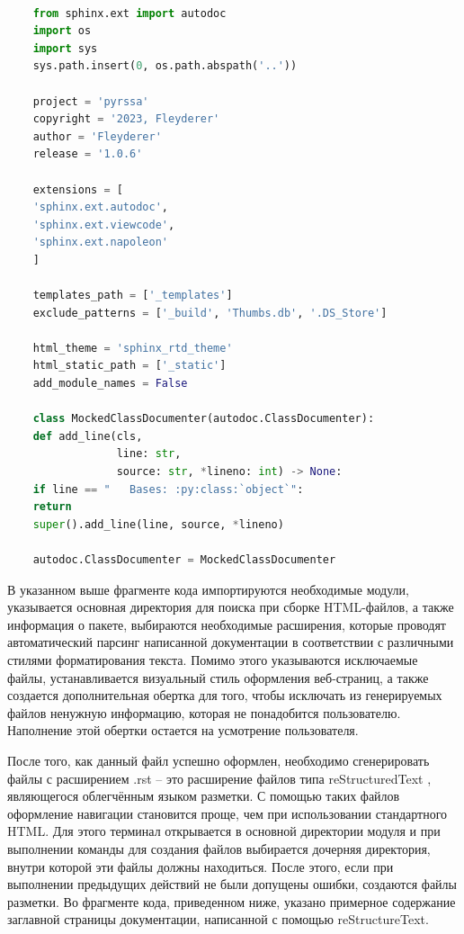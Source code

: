 \documentclass[specialist,
			   substylefile = spbu_report.rtx,
			   subf,href,colorlinks=true, 12pt]{disser}
\begin{document}
\begin{lstlisting}[language=Python, caption=Содержимое конфигурационного файла.]
	
	from sphinx.ext import autodoc
	import os
	import sys
	sys.path.insert(0, os.path.abspath('..'))

	project = 'pyrssa'
	copyright = '2023, Fleyderer'
	author = 'Fleyderer'
	release = '1.0.6'
	
	extensions = [
	'sphinx.ext.autodoc',
	'sphinx.ext.viewcode',
	'sphinx.ext.napoleon'
	]
	
	templates_path = ['_templates']
	exclude_patterns = ['_build', 'Thumbs.db', '.DS_Store']
	
	html_theme = 'sphinx_rtd_theme'
	html_static_path = ['_static']
	add_module_names = False
	
	class MockedClassDocumenter(autodoc.ClassDocumenter):
	def add_line(cls,
	             line: str, 
	             source: str, *lineno: int) -> None:
	if line == "   Bases: :py:class:`object`":
	return
	super().add_line(line, source, *lineno)
	
	autodoc.ClassDocumenter = MockedClassDocumenter
\end{lstlisting}

В указанном выше фрагменте кода импортируются необходимые модули, указывается основная директория для поиска при сборке HTML-файлов, а также информация о пакете, выбираются необходимые расширения, которые проводят автоматический парсинг написанной документации в соответствии с различными стилями форматирования текста. Помимо этого указываются исключаемые файлы, устанавливается визуальный стиль оформления веб-страниц, а также создается дополнительная обертка для того, чтобы исключать из генерируемых файлов ненужную информацию, которая не понадобится пользователю. Наполнение этой обертки остается на усмотрение пользователя.

После того, как данный файл успешно оформлен, необходимо сгенерировать файлы с расширением .rst – это расширение файлов типа reStructuredText \cite{rst-doc}, являющегося облегчённым языком разметки. С помощью таких файлов оформление навигации становится проще, чем при использовании стандартного HTML. Для этого терминал открывается в основной директории модуля и при выполнении команды для создания файлов выбирается дочерняя директория, внутри которой эти файлы должны находиться. После этого, если при выполнении предыдущих действий не были допущены ошибки, создаются файлы разметки. Во фрагменте кода, приведенном ниже, указано примерное содержание заглавной страницы документации, написанной с помощью reStructureText.
\end{document}
